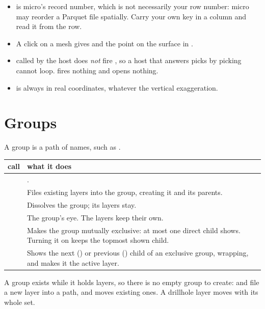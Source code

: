 \begin{itemize}
\item {} is micro's record number, which is not necessarily your row number: micro may
  reorder a Parquet file spatially. Carry your own key in a column and read it from the row.
\item A click on a mesh gives  and the point on the surface in .
\item {} called by the host does \emph{not} fire , so a host that
  answers picks by picking cannot loop.  fires nothing and opens nothing.
\item {} is always in real coordinates, whatever the vertical exaggeration.
\end{itemize}

\section{Groups}\label{sec:host-groups}

A group is a path of names, such as .

\begin{tabularx}{\linewidth}{@{}>{\raggedright\arraybackslash}p{44mm}L@{}}
\toprule
call & what it does \\
\midrule
{} & . \\
 & Files existing layers into the group, creating it and its parents. \\
 & Dissolves the group; its layers stay. \\
 & The group's eye. The layers keep their own. \\
 & Makes the group mutually exclusive: at most one direct child
  shows. Turning it on keeps the topmost shown child. \\
 & Shows the next () or previous () child of an
  exclusive group, wrapping, and makes it the active layer. \\
\bottomrule
\end{tabularx}

A group exists while it holds layers, so there is no empty group to create:
 and  file a new layer into a path,
and  moves existing ones. A drillhole layer moves with its whole set.

